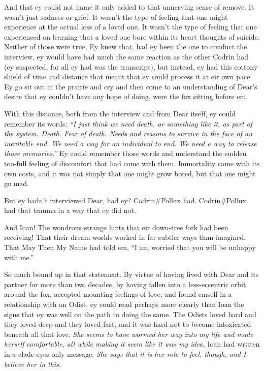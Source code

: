 And that ey could not name it only added to that unnerving sense of remove. It wasn't just sadness or grief. It wasn't the type of feeling that one might experience at the actual loss of a loved one. It wasn't the type of feeling that one experienced on learning that a loved one bore within its heart thoughts of suicide. Neither of those were true. Ey knew that, had ey been the one to conduct the interview, ey would have had much the same reaction as the other Codrin had (ey suspected, for all ey had was the transcript), but instead, ey had this cottony shield of time and distance that meant that ey could process it at eir own pace. Ey go sit out in the prairie and cry and then come to an understanding of Dear's desire that ey couldn't have any hope of doing, were the fox sitting before em.

With this distance, both from the interview and from Dear itself, ey could remember its words: \emph{``I just think we need death, or something like it, as part of the system. Death. Fear of death. Needs and reasons to survive in the face of an inevitable end. We need a way for an individual to end. We need a way to release those memories.''} Ey could remember those words and understand the sudden too-full feeling of discomfort that had come with them. Immortality came with its own costs, and it was not simply that one might grow bored, but that one might go mad.

But ey hadn't interviewed Dear, had ey? Codrin\#Pollux had. Codrin\#Pollux had that trauma in a way that ey did not.

And Ioan! The wondrous strange hints that eir down-tree fork had been receiving! That their dream worlds worked in far subtler ways than imagined. That May Then My Name had told em, ``I am worried that you will be unhappy with me.''

So much bound up in that statement. By virtue of having lived with Dear and its partner for more than two decades, by having fallen into a less-eccentric orbit around the fox, accepted mounting feelings of love, and found emself in a relationship with an Odist, ey could read perhaps more clearly than Ioan the signs that ey was well on the path to doing the same. The Odists loved hard and they loved deep and they loved fast, and it was hard not to become intoxicated beneath all that love. \emph{She seems to have wormed her way into my life and made herself comfortable, all while making it seem like it was my idea,} Ioan had written in a clade-eyes-only message. \emph{She says that it is her role to feel, though, and I believe her in this.}

